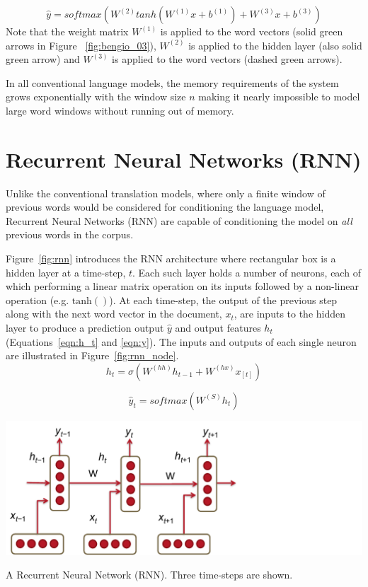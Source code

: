 \documentclass{tufte-handout}
\begin{document}
\begin{equation}
	\hat{y} = softmax (W^{(2)} tanh(W^{(1)}x+b^{(1)})+W^{(3)}x+b^{(3)})
	\label{eqn:bengio_eqn}
\end{equation}
Note that the weight matrix $W^{(1)}$ is applied to the word vectors (solid green arrows in Figure ~\ref{fig:bengio_03}), $W^{(2)}$ is applied to the hidden layer (also solid green arrow) and $W^{(3)}$ is applied to the word vectors (dashed green arrows).

In all conventional language models, the memory requirements of the system grows exponentially with the window size $n$ making it nearly impossible to model large word windows without running out of memory.

\section{Recurrent Neural Networks (RNN)}
Unlike the conventional translation models, where only a finite window of previous words would be considered for conditioning the language model, Recurrent Neural Networks (RNN) are capable of conditioning the model on \textit{all} previous words in the corpus. 

Figure~\ref{fig:rnn} introduces the RNN architecture where rectangular box is a hidden layer at a time-step, $t$. Each such layer holds a number of neurons, each of which performing a linear matrix operation on its inputs followed by a non-linear operation (e.g. $\operatorname{tanh()}$). At each time-step, the output of the previous step along with the next word vector in the document, $x_t$, are inputs to the hidden layer to produce a prediction output $\hat{y}$ and output features $h_t$ (Equations~\ref{eqn:h_t} and \ref{eqn:y}). The inputs and outputs of each single neuron are illustrated in Figure~\ref{fig:rnn_node}.
\begin{equation}
	h_t = \sigma (W^{(hh)}h_{t-1} + W^{(hx)}x_{[t]})
	\label{eqn:h_t}
\end{equation}

\begin{equation}
	\hat{y}_t = softmax(W^{(S)}h_t)
	\label{eqn:y}
\end{equation}

\begin{marginfigure}
	\centering
	\includegraphics[width=\linewidth]{rnn.pdf}
	\caption {A Recurrent Neural Network (RNN). Three time-steps are shown.}
	\label{fig:rnn}
\end{marginfigure}
\end{document}
